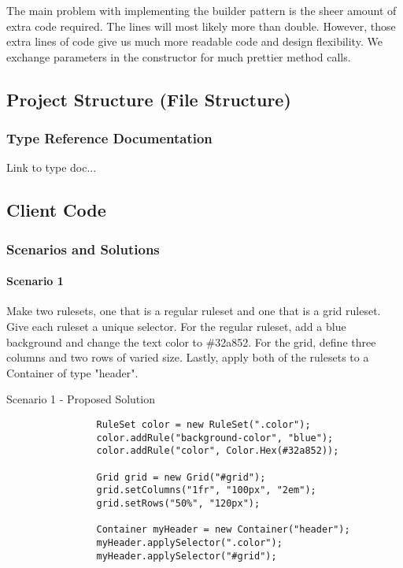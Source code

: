 \documentclass[12pt]{article}
\begin{document}
        The main problem with implementing the builder pattern is the sheer amount of extra code required. The lines will most likely more than double. However, those extra lines of code give us much more readable code and design flexibility. We exchange parameters in the constructor for much prettier method calls.

    \subsection{Project Structure (File Structure)}

        \subsubsection{Type Reference Documentation}
        Link to type doc...

    \subsection{Client Code}

        \subsubsection{Scenarios and Solutions}

        \paragraph{Scenario 1}
        Make two rulesets, one that is a regular ruleset and one that is a grid ruleset. Give each ruleset a unique selector. For the regular ruleset, add a blue background and change the text color to \#32a852. For the grid, define three columns and two rows of varied size. Lastly, apply both of the rulesets to a Container of type "header".
        
        \begin{shaded}
            Scenario 1 - Proposed Solution
            \begin{lstlisting}
                RuleSet color = new RuleSet(".color");
                color.addRule("background-color", "blue");
                color.addRule("color", Color.Hex(#32a852));

                Grid grid = new Grid("#grid");
                grid.setColumns("1fr", "100px", "2em");
                grid.setRows("50%", "120px");

                Container myHeader = new Container("header");
                myHeader.applySelector(".color");
                myHeader.applySelector("#grid");
            \end{lstlisting}
        \end{shaded}
\end{document}

